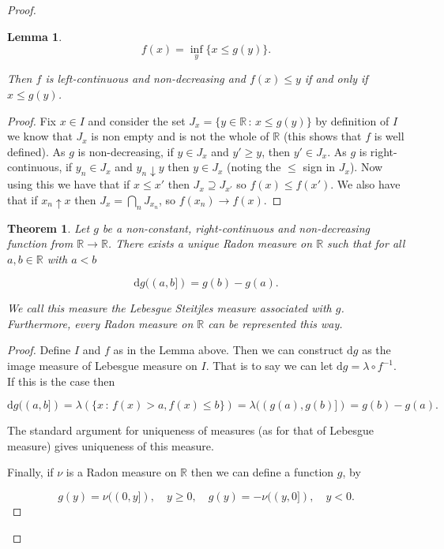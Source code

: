 \documentclass[
]{book}
\newtheorem{theorem}{Theorem}[chapter]
\newtheorem{lemma}{Lemma}[chapter]
\theoremstyle{definition}
\theoremstyle{definition}
\theoremstyle{definition}
\theoremstyle{definition}
\theoremstyle{remark}
\begin{document}
\begin{proof}
\begin{lemma}
\[ f(x) = \inf_y \{ x \leq g(y)\}. \]

Then \(f\) is left-continuous and non-decreasing and \(f(x) \leq y\) if and only if \(x \leq g(y)\).
\end{lemma}

\begin{proof}
Fix \(x \in I\) and consider the set \(J_x = \{ y \in \mathbb{R}\,:\, x \leq g(y)\}\) by definition of \(I\) we know that \(J_x\) is non empty and is not the whole of \(\mathbb{R}\) (this shows that \(f\) is well defined). As \(g\) is non-decreasing, if \(y \in J_x\) and \(y' \geq y\), then \(y' \in J_x\). As \(g\) is right-continuous, if \(y_n \in J_x\) and \(y_n \downarrow y\) then \(y \in J_x\) (noting the \(\leq\) sign in \(J_x\)). Now using this we have that if \(x \leq x'\) then \(J_x \supseteq J_{x'}\) so \(f(x) \leq f(x')\). We also have that if \(x_n \uparrow x\) then \(J_x = \bigcap_n J_{x_n}\), so \(f(x_n) \rightarrow f(x)\).
\end{proof}

\begin{theorem}
Let \(g\) be a non-constant, right-continuous and non-decreasing function from \(\mathbb{R} \rightarrow \mathbb{R}\). There exists a unique Radon measure on \(\mathbb{R}\) such that for all \(a,b \in \mathbb{R}\) with \(a < b\)

\[ \mathrm{d}g((a,b]) = g(b) - g(a). \]

We call this measure the \emph{Lebesgue Steitjles} measure associated with \(g\). Furthermore, every Radon measure on \(\mathbb{R}\) can be represented this way.
\end{theorem}

\begin{proof}
Define \(I\) and \(f\) as in the Lemma above. Then we can construct \(\mathrm{d}g\) as the image measure of Lebesgue measure on \(I\). That is to say we can let \(\mathrm{d}g = \lambda \circ f^{-1}\). If this is the case then

\[ \mathrm{d}g ((a,b]) = \lambda \left(\{ x \, :\, f(x) > a, f(x) \leq b \} \right) = \lambda ((g(a), g(b)]) = g(b) - g(a). \]

The standard argument for uniqueness of measures (as for that of Lebesgue measure) gives uniqueness of this measure.

Finally, if \(\nu\) is a Radon measure on \(\mathbb{R}\) then we can define a function \(g\), by

\[ g(y) = \nu((0,y]), \quad y \geq 0, \quad g(y) = -\nu((y,0]), \quad y<0. \]


\end{proof}
\end{proof}
\end{document}
